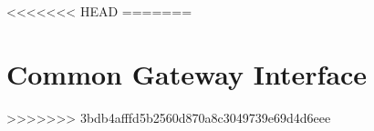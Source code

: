\documentclass{wileySix}
\begin{document}
%


%

%

%


%

%

%

<<<<<<< HEAD
%
=======
\chapter[Common Gateway Interface]
{Common Gateway Interface}

>>>>>>> 3bdb4afffd5b2560d870a8c3049739e69d4d6eee

%
\end{document}
